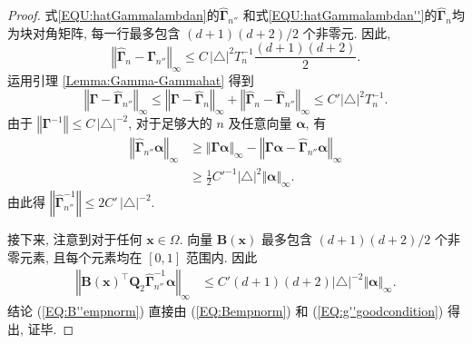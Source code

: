 \documentclass[a4paper,openay,14pt]{ctexbook}
\numberwithin{equation}{section}
\numberwithin{lem}{section}
\begin{document}
\begin{proof}
式\eqref{EQU:hatGammalambdan}的$\hat{\bm{\Gamma}}_{n''}$ 和式\eqref{EQU:hatGammalambdan''}的$\hat{\bm{\Gamma}}_{n}$均为块对角矩阵, 每一行最多包含 $(d+1)(d+2)/2$ 个非零元. 因此,
\[
\left\Vert \hat{\bm{\Gamma}}_{n} - \hat{\bm{\Gamma}}_{n''}\right\Vert_{\infty} 
\leq C \, \vert\triangle\vert^2 T_n^{-1}\frac{(d+1)(d+2)}{2}.
\]
运用引理 \ref{Lemma:Gamma-Gammahat} 得到
\[
\left\Vert \bm{\Gamma} - \hat{\bm{\Gamma}}_{n''}\right\Vert_{\infty} 
\leq \left\Vert \bm{\Gamma}- \hat{\bm{\Gamma}}_{n}\right\Vert_{\infty} 
+ \left\Vert \hat{\bm{\Gamma}}_{n} - \hat{\bm{\Gamma}}_{n''}\right\Vert_{\infty} 
\leq C'\vert\triangle\vert^2T_n^{-1}.
\]
由于 $\left\Vert\bm{\Gamma}^{-1}\right\Vert \le C \, \vert\triangle\vert^{-2}$, 对于足够大的 $n$ 及任意向量 $\boldsymbol{\alpha}$, 有
\begin{align*}
\left\Vert \hat{\bm{\Gamma}}_{n''}\boldsymbol{\alpha}\right\Vert_{\infty}
&\geq \Vert\bm{\Gamma}\boldsymbol{\alpha}\Vert_{\infty}
- \left\Vert \bm{\Gamma}\boldsymbol{\alpha} - \hat{\bm{\Gamma}}_{n''}\boldsymbol{\alpha}\right\Vert_{\infty} \\
&\geq \tfrac{1}{2}C'^{-1}\vert\triangle\vert^2\Vert\boldsymbol{\alpha}\Vert_{\infty}.
\end{align*}
由此得 $\left\Vert \hat{\bm{\Gamma}}^{-1}_{n''}\right\Vert \leq 2C' \, \vert\triangle\vert^{-2}$.

接下来, 注意到对于任何 $\boldsymbol{x} \in \Omega$. 向量 $\mathbf{B}(\boldsymbol{x})$ 最多包含 $(d+1)(d+2)/2$ 个非零元素, 且每个元素均在 $[0,1]$ 范围内. 因此
\begin{align*}
\left\Vert \mathbf{B}(\boldsymbol{x})^{\top}\mathbf{Q}_2\hat{\bm{\Gamma}}_{n''}^{-1}\boldsymbol{\alpha}\right\Vert_{\infty}
&\leq C'(d+1)(d+2)\vert\triangle\vert^{-2}\Vert\boldsymbol{\alpha}\Vert_{\infty}.
\end{align*}
结论 (\ref{EQ:B''empnorm}) 直接由 (\ref{EQ:Bempnorm}) 和 (\ref{EQ:g''goodcondition}) 得出, 证毕.
\end{proof}
\end{document}

